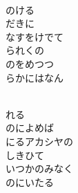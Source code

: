 \documentclass[10pt,b5j]{tarticle} %
\begin{document}
\vspace{1.5em} %
\newcommand{\linespace}{0.5em} %
\newcommand{\blocksize}{0.5\hsize} %
\newcommand{\itemmargin}{3em} %
\begin{enumerate} %
    \setlength{\itemindent}{\itemmargin} %
    \begin{minipage}[c]{\blocksize}
    
        \vspace{\linespace}
        \item~\\
        のける\\
        だきに\\
        なすをけでて\\
        られくの\\
        のをめつつ\\
        らかにはなん
        
    \end{minipage}
    \begin{minipage}[c]{\blocksize}
        
        \vspace{\linespace}
        \item~\\
        れる\\
        のによめば\\
        にるアカシヤの\\
        しきひて\\
        いつかのみなく\\
        のにいたる
        
    \end{minipage}
    \begin{minipage}[c]{\blocksize}
        

\end{minipage}
\end{enumerate}
\end{document}
